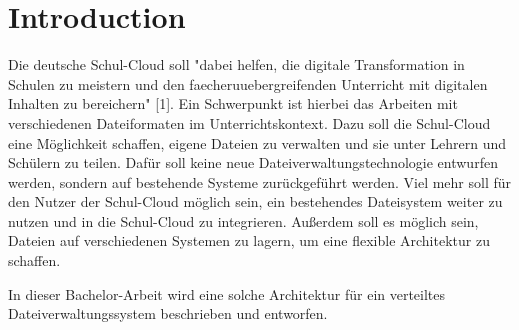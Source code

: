 \section{Introduction}
\label{sec:intro}

Die deutsche Schul-Cloud soll "dabei helfen, die digitale Transformation in Schulen zu meistern und den faecheruuebergreifenden Unterricht mit digitalen Inhalten zu bereichern" [1]. Ein Schwerpunkt ist hierbei das Arbeiten mit verschiedenen Dateiformaten im Unterrichtskontext. Dazu soll die Schul-Cloud eine Möglichkeit schaffen, eigene Dateien zu verwalten und sie unter Lehrern und Schülern zu teilen. Dafür soll keine neue Dateiverwaltungstechnologie entwurfen werden, sondern auf bestehende Systeme zurückgeführt werden. Viel mehr soll für den Nutzer der Schul-Cloud möglich sein, ein bestehendes Dateisystem weiter zu nutzen und in die Schul-Cloud zu integrieren. Außerdem soll es möglich sein, Dateien auf verschiedenen Systemen zu lagern, um eine flexible Architektur zu schaffen.

In dieser Bachelor-Arbeit wird eine solche Architektur für ein verteiltes Dateiverwaltungssystem beschrieben und entworfen. 

\clearpage
